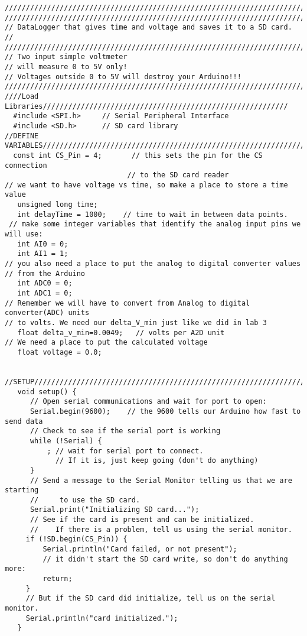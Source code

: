 \bigskip
\begin{verbatim}
//////////////////////////////////////////////////////////////////////////////////////////
//////////////////////////////////////////////////////////////////////////////////////////
// DataLogger that gives time and voltage and saves it to a SD card.
//   
//////////////////////////////////////////////////////////////////////////////////////////
// Two input simple voltmeter 
// will measure 0 to 5V only!
// Voltages outside 0 to 5V will destroy your Arduino!!!
//////////////////////////////////////////////////////////////////////////////////////////
////Load Libraries//////////////////////////////////////////////////////////
  #include <SPI.h>     // Serial Peripheral Interface
  #include <SD.h>      // SD card library
//DEFINE VARIABLES///////////////////////////////////////////////////////////////////////
  const int CS_Pin = 4;       // this sets the pin for the CS connection
                             // to the SD card reader
// we want to have voltage vs time, so make a place to store a time value
   unsigned long time;
   int delayTime = 1000;    // time to wait in between data points.
 // make some integer variables that identify the analog input pins we will use:
   int AI0 = 0;
   int AI1 = 1;
// you also need a place to put the analog to digital converter values 
// from the Arduino
   int ADC0 = 0;
   int ADC1 = 0;
// Remember we will have to convert from Analog to digital converter(ADC) units
// to volts. We need our delta_V_min just like we did in lab 3 
   float delta_v_min=0.0049;   // volts per A2D unit
// We need a place to put the calculated voltage
   float voltage = 0.0;
 
 //SETUP/////////////////////////////////////////////////////////////////////////
   void setup() {
      // Open serial communications and wait for port to open:
      Serial.begin(9600);    // the 9600 tells our Arduino how fast to send data
      // Check to see if the serial port is working      
      while (!Serial) {
          ; // wait for serial port to connect. 
            // If it is, just keep going (don't do anything)
      }
      // Send a message to the Serial Monitor telling us that we are starting
      //     to use the SD card.
      Serial.print("Initializing SD card...");
      // See if the card is present and can be initialized.
      //    If there is a problem, tell us using the serial monitor.
     if (!SD.begin(CS_Pin)) {
         Serial.println("Card failed, or not present");
         // it didn't start the SD card write, so don't do anything more:
         return;
     }
     // But if the SD card did initialize, tell us on the serial monitor.
     Serial.println("card initialized.");
   }
 

\end{verbatim}
